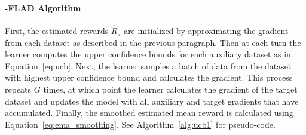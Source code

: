 \paragraph{\ucb{}-FLAD Algorithm}
First, the estimated rewards $\hat{R}_{a}$ are initialized by approximating the gradient from each dataset as described in the previous paragraph. Then at each turn the learner computes the upper confidence bounds for each auxiliary dataset as in Equation~\ref{eq:ucb}. Next, the learner samples a batch of data from the dataset with highest upper confidence bound and calculates the gradient.
This process repeats $G$ times, at which point the learner calculates the gradient of the target dataset and updates the model with all auxiliary and target gradients that have accumulated. Finally, the smoothed estimated mean reward is calculated using Equation~\ref{eq:ema_smoothing}. See Algorithm~\ref{alg:ucb1} for pseudo-code.


